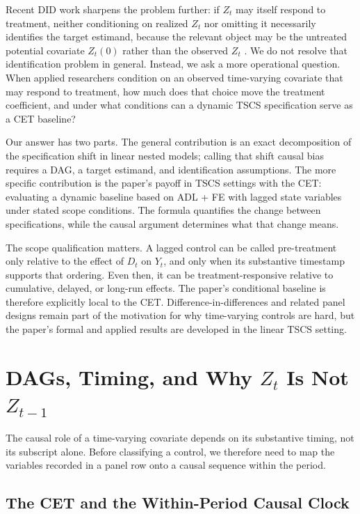 \documentclass[
]{article}
\begin{document}
Recent DID work sharpens the problem further: if \(Z_t\) may itself
respond to treatment, neither conditioning on realized \(Z_t\) nor
omitting it necessarily identifies the target estimand, because the
relevant object may be the untreated potential covariate \(Z_t(0)\)
rather than the observed \(Z_t\)
\citep{caetano_callaway2024, caetano_etal2022}. We do not resolve that
identification problem in general. Instead, we ask a more operational
question. When applied researchers condition on an observed time-varying
covariate that may respond to treatment, how much does that choice move
the treatment coefficient, and under what conditions can a dynamic TSCS
specification serve as a CET baseline?

Our answer has two parts. The general contribution is an exact
decomposition of the specification shift in linear nested models;
calling that shift causal bias requires a DAG, a target estimand, and
identification assumptions. The more specific contribution is the
paper's payoff in TSCS settings with the CET: evaluating a dynamic
baseline based on ADL + FE with lagged state variables under stated
scope conditions. The formula quantifies the change between
specifications, while the causal argument determines what that change
means.

The scope qualification matters. A lagged control can be called
pre-treatment only relative to the effect of \(D_t\) on \(Y_t\), and
only when its substantive timestamp supports that ordering. Even then,
it can be treatment-responsive relative to cumulative, delayed, or
long-run effects. The paper's conditional baseline is therefore
explicitly local to the CET. Difference-in-differences and related panel
designs remain part of the motivation for why time-varying controls are
hard, but the paper's formal and applied results are developed in the
linear TSCS setting.

\section{\texorpdfstring{DAGs, Timing, and Why \(Z_t\) Is Not
\(Z_{t-1}\)
\label{sec:timing}}{DAGs, Timing, and Why Z\_t Is Not Z\_\{t-1\} }}\label{dags-timing-and-why-z_t-is-not-z_t-1}

The causal role of a time-varying covariate depends on its substantive
timing, not its subscript alone. Before classifying a control, we
therefore need to map the variables recorded in a panel row onto a
causal sequence within the period.

\subsection{The CET and the Within-Period Causal
Clock}\label{the-cet-and-the-within-period-causal-clock}
\end{document}
